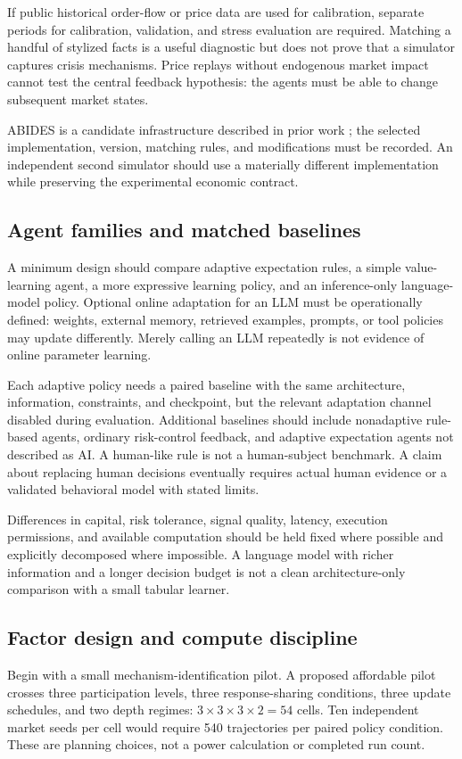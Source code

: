 \documentclass[11pt,a4paper]{article}
\theoremstyle{definition}
\theoremstyle{remark}
\begin{document}
If public historical order-flow or price data are used for calibration, separate periods for calibration, validation, and stress evaluation are required. Matching a handful of stylized facts is a useful diagnostic but does not prove that a simulator captures crisis mechanisms. Price replays without endogenous market impact cannot test the central feedback hypothesis: the agents must be able to change subsequent market states.

ABIDES is a candidate infrastructure described in prior work \citep{byrd2019}; the selected implementation, version, matching rules, and modifications must be recorded. An independent second simulator should use a materially different implementation while preserving the experimental economic contract.

\subsection{Agent families and matched baselines}
A minimum design should compare adaptive expectation rules, a simple value-learning agent, a more expressive learning policy, and an inference-only language-model policy. Optional online adaptation for an LLM must be operationally defined: weights, external memory, retrieved examples, prompts, or tool policies may update differently. Merely calling an LLM repeatedly is not evidence of online parameter learning.

Each adaptive policy needs a paired baseline with the same architecture, information, constraints, and checkpoint, but the relevant adaptation channel disabled during evaluation. Additional baselines should include nonadaptive rule-based agents, ordinary risk-control feedback, and adaptive expectation agents not described as AI. A human-like rule is not a human-subject benchmark. A claim about replacing human decisions eventually requires actual human evidence or a validated behavioral model with stated limits.

Differences in capital, risk tolerance, signal quality, latency, execution permissions, and available computation should be held fixed where possible and explicitly decomposed where impossible. A language model with richer information and a longer decision budget is not a clean architecture-only comparison with a small tabular learner.

\subsection{Factor design and compute discipline}
Begin with a small mechanism-identification pilot. A proposed affordable pilot crosses three participation levels, three response-sharing conditions, three update schedules, and two depth regimes: $3\times3\times3\times2=54$ cells. Ten independent market seeds per cell would require 540 trajectories per paired policy condition. These are planning choices, not a power calculation or completed run count.
\end{document}
